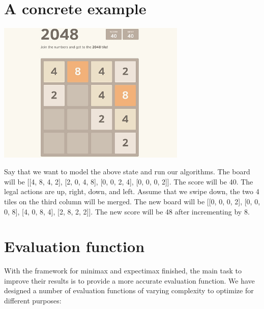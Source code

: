 \documentclass[11pt]{article}
\begin{document}
\section{A concrete example}

\begin{centering}

\includegraphics[width=90mm]{2048_screenshot.jpg}

\end{centering}

Say that we want to model the above state and run our algorithms. The board will be [[4, 8, 4, 2], [2, 0, 4, 8], [0, 0, 2, 4], [0, 0, 0, 2]]. The score will be 40. The legal actions are up, right, down, and left. Assume that we swipe down, the two 4 tiles on the third column will be merged. The new board will be [[0, 0, 0, 2], [0, 0, 0, 8], [4, 0, 8, 4], [2, 8, 2, 2]]. The new score will be 48 after incrementing by 8.

\section{Evaluation function}

With the framework for minimax and expectimax finished, the main task to improve their results is to provide a more accurate evaluation function. We have designed a number of evaluation functions of varying complexity to optimize for different purposes:
\end{document}
